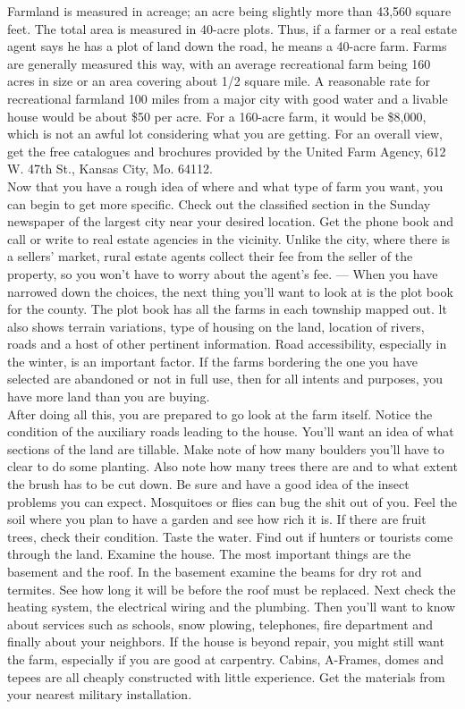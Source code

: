 \documentclass[11pt,twoside,a4paper]{book}
\begin{document}
Farmland is measured in acreage; an acre being slightly more than 43,560 square feet. The total area is measured in 40-acre plots. Thus, if a farmer or a real estate agent says he has a plot of land down the road, he means a 40-acre farm. Farms are generally measured this way, with an average recreational farm being 160 acres in size or an area covering about 1/2 square mile. A reasonable rate for recreational farmland 100 miles from a major city with good water and a livable house would be about \$50 per acre. For a 160-acre farm, it would be \$8,000, which is not an awful lot considering what you are getting. For an overall view, get the free catalogues and brochures provided by the United Farm Agency, 612 W. 47th St., Kansas City, Mo. 64112.~\\

Now that you have a rough idea of where and what type of farm you want, you can begin to get more specific. Check out the classified section in the Sunday newspaper of the largest city near your desired location. Get the phone book and call or write to real estate agencies in the vicinity. Unlike the city, where there is a sellers' market, rural estate agents collect their fee from the seller of the property, so you won't have to worry about the agent's fee. --- When you have narrowed down the choices, the next thing you'll want to look at is the plot book for the county. The plot book has all the farms in each township mapped out. lt also shows terrain variations, type of housing on the land, location of rivers, roads and a host of other pertinent information. Road accessibility, especially in the winter, is an important factor. If the farms bordering the one you have selected are abandoned or not in full use, then for all intents and purposes, you have more land than you are buying.~\\

After doing all this, you are prepared to go look at the farm itself. Notice the condition of the auxiliary roads leading to the house. You'll want an idea of what sections of the land are tillable. Make note of how many boulders you'll have to clear to do some planting. Also note how many trees there are and to what extent the brush has to be cut down. Be sure and have a good idea of the insect problems you can expect. Mosquitoes or flies can bug the shit out of you. Feel the soil where you plan to have a garden and see how rich it is. If there are fruit trees, check their condition. Taste the water. Find out if hunters or tourists come through the land. Examine the house. The most important things are the basement and the roof. In the basement examine the beams for dry rot and termites. See how long it will be before the roof must be replaced. Next check the heating system, the electrical wiring and the plumbing. Then you'll want to know about services such as schools, snow plowing, telephones, fire department and finally about your neighbors. If the house is beyond repair, you might still want the farm, especially if you are good at carpentry. Cabins, A-Frames, domes and tepees are all cheaply constructed with little experience. Get the materials from your nearest military installation.~\\
\end{document}
